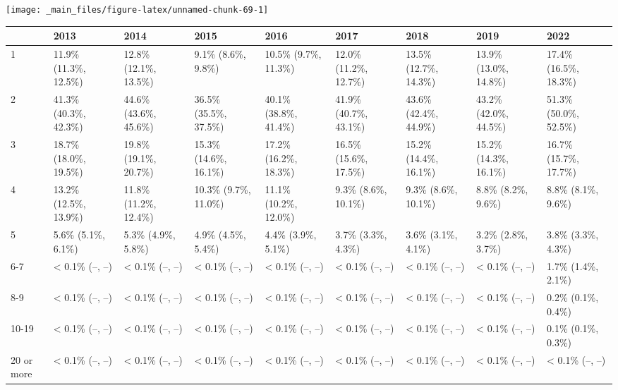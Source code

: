 \documentclass[
]{book}
\begin{document}
\texttt{[image: \_main\_files/figure-latex/unnamed-chunk-69-1]}

\begin{table}
\centering
\begin{tabular}[t]{>{}l|>{}l|>{}l|>{}l|>{}l|>{}l|>{}l|>{}l|>{}l}
\hline
  & 2013 & 2014 & 2015 & 2016 & 2017 & 2018 & 2019 & 2022\\
\hline
1 & 11.9\% (11.3\%, 12.5\%) & 12.8\% (12.1\%, 13.5\%) & 9.1\% (8.6\%, 9.8\%) & 10.5\% (9.7\%, 11.3\%) & 12.0\% (11.2\%, 12.7\%) & 13.5\% (12.7\%, 14.3\%) & 13.9\% (13.0\%, 14.8\%) & 17.4\% (16.5\%, 18.3\%)\\
\hline
2 & 41.3\% (40.3\%, 42.3\%) & 44.6\% (43.6\%, 45.6\%) & 36.5\% (35.5\%, 37.5\%) & 40.1\% (38.8\%, 41.4\%) & 41.9\% (40.7\%, 43.1\%) & 43.6\% (42.4\%, 44.9\%) & 43.2\% (42.0\%, 44.5\%) & 51.3\% (50.0\%, 52.5\%)\\
\hline
3 & 18.7\% (18.0\%, 19.5\%) & 19.8\% (19.1\%, 20.7\%) & 15.3\% (14.6\%, 16.1\%) & 17.2\% (16.2\%, 18.3\%) & 16.5\% (15.6\%, 17.5\%) & 15.2\% (14.4\%, 16.1\%) & 15.2\% (14.3\%, 16.1\%) & 16.7\% (15.7\%, 17.7\%)\\
\hline
4 & 13.2\% (12.5\%, 13.9\%) & 11.8\% (11.2\%, 12.4\%) & 10.3\% (9.7\%, 11.0\%) & 11.1\% (10.2\%, 12.0\%) & 9.3\% (8.6\%, 10.1\%) & 9.3\% (8.6\%, 10.1\%) & 8.8\% (8.2\%, 9.6\%) & 8.8\% (8.1\%, 9.6\%)\\
\hline
5 & 5.6\% (5.1\%, 6.1\%) & 5.3\% (4.9\%, 5.8\%) & 4.9\% (4.5\%, 5.4\%) & 4.4\% (3.9\%, 5.1\%) & 3.7\% (3.3\%, 4.3\%) & 3.6\% (3.1\%, 4.1\%) & 3.2\% (2.8\%, 3.7\%) & 3.8\% (3.3\%, 4.3\%)\\
\hline
6-7 & < 0.1\% (--, --) & < 0.1\% (--, --) & < 0.1\% (--, --) & < 0.1\% (--, --) & < 0.1\% (--, --) & < 0.1\% (--, --) & < 0.1\% (--, --) & 1.7\% (1.4\%, 2.1\%)\\
\hline
8-9 & < 0.1\% (--, --) & < 0.1\% (--, --) & < 0.1\% (--, --) & < 0.1\% (--, --) & < 0.1\% (--, --) & < 0.1\% (--, --) & < 0.1\% (--, --) & 0.2\% (0.1\%, 0.4\%)\\
\hline
10-19 & < 0.1\% (--, --) & < 0.1\% (--, --) & < 0.1\% (--, --) & < 0.1\% (--, --) & < 0.1\% (--, --) & < 0.1\% (--, --) & < 0.1\% (--, --) & 0.1\% (0.1\%, 0.3\%)\\
\hline
20 or more & < 0.1\% (--, --) & < 0.1\% (--, --) & < 0.1\% (--, --) & < 0.1\% (--, --) & < 0.1\% (--, --) & < 0.1\% (--, --) & < 0.1\% (--, --) & < 0.1\% (--, --)\\
\hline
\end{tabular}
\end{table}
\end{document}
